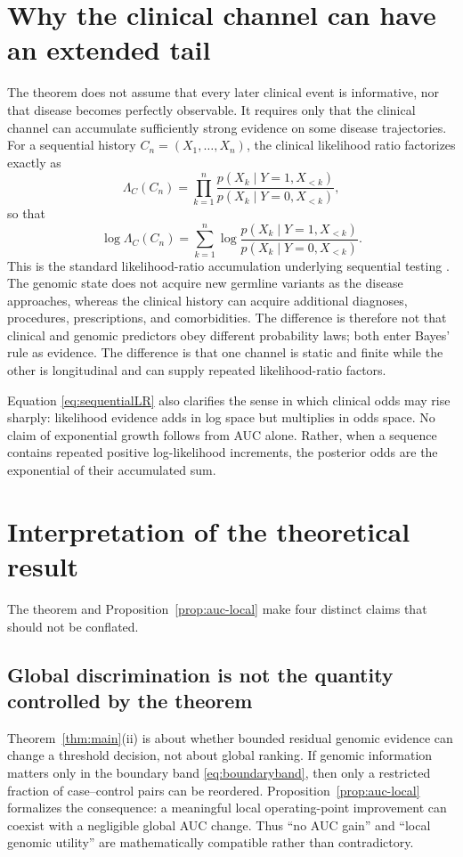 \documentclass[journal]{IEEEtran}
\newcommand{\LR}{\Lambda}
\begin{document}
\section{Why the clinical channel can have an extended tail}

The theorem does not assume that every later clinical event is informative, nor that disease becomes perfectly observable. It requires only that the clinical channel can accumulate sufficiently strong evidence on some disease trajectories. For a sequential history $C_n=(X_1,\ldots,X_n)$, the clinical likelihood ratio factorizes exactly as
\begin{equation}
\LR_C(C_n)
=\prod_{k=1}^{n}
\frac{p(X_k\mid Y=1,X_{<k})}
     {p(X_k\mid Y=0,X_{<k})},
\label{eq:sequentialLR}
\end{equation}
so that
\begin{equation}
\log\LR_C(C_n)
=\sum_{k=1}^{n}
\log
\frac{p(X_k\mid Y=1,X_{<k})}
     {p(X_k\mid Y=0,X_{<k})}.
\label{eq:sequentiallogLR}
\end{equation}
This is the standard likelihood-ratio accumulation underlying sequential testing \cite{Wald1945}. The genomic state does not acquire new germline variants as the disease approaches, whereas the clinical history can acquire additional diagnoses, procedures, prescriptions, and comorbidities. The difference is therefore not that clinical and genomic predictors obey different probability laws; both enter Bayes' rule as evidence. The difference is that one channel is static and finite while the other is longitudinal and can supply repeated likelihood-ratio factors.

Equation \eqref{eq:sequentialLR} also clarifies the sense in which clinical odds may rise sharply: likelihood evidence adds in log space but multiplies in odds space. No claim of exponential growth follows from AUC alone. Rather, when a sequence contains repeated positive log-likelihood increments, the posterior odds are the exponential of their accumulated sum.

\section{Interpretation of the theoretical result}

The theorem and Proposition~\ref{prop:auc-local} make four distinct claims that should not be conflated.

\subsection{Global discrimination is not the quantity controlled by the theorem}
Theorem~\ref{thm:main}(ii) is about whether bounded residual genomic evidence can change a threshold decision, not about global ranking. If genomic information matters only in the boundary band \eqref{eq:boundaryband}, then only a restricted fraction of case--control pairs can be reordered. Proposition~\ref{prop:auc-local} formalizes the consequence: a meaningful local operating-point improvement can coexist with a negligible global AUC change. Thus ``no AUC gain'' and ``local genomic utility'' are mathematically compatible rather than contradictory.
\end{document}
